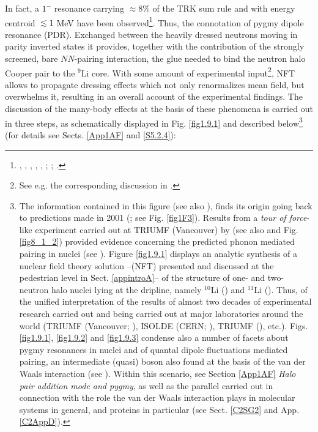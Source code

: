  In fact, a $1^-$ resonance carrying $\approx 8\%$ of the TRK sum rule and with energy centroid  $\lesssim 1$ MeV have been observed\footnote{\label{f119C2} \cite{Zinser:97}, \cite{Nakamura:06}, \cite{Shimoura:95}, \cite{Ieki:93}, \cite{Sackett:93},  \cite{Kobayashi:89}; \cite{Kanungo:15}; \cite{Aumann:19}.}. Thus, the connotation of pygmy dipole  resonance (PDR). Exchanged between the heavily dressed neutrons moving in  parity inverted states it provides, together with the contribution of the strongly screened, bare $NN$-pairing interaction, the glue needed to bind the neutron halo Cooper pair to the $^9$Li core. With some amount of experimental input\footnote{See e.g. the corresponding discussion in \cite{Barranco:17}.}, NFT allows to propagate dressing effects which not only renormalizes mean field, but overwhelms it, resulting in an overall account of the experimental findings.
The discussion of the many-body effects at the basis of these phenomena is carried out   in three steps, as schematically displayed in Fig. \ref{fig1.9.1} and described below\footnote{The information contained in this figure (see also \cite{Broglia:19b}), finds its origin going back to predictions made in 2001 (\cite{Barranco:01}; see Fig. \ref{fig1F3}). Results from a \textit{tour of force}-like experiment carried out at TRIUMF (Vancouver) by \cite{Tanihata:08} (see also \cite{Tanihata:13} and Fig. \ref{fig8_1_2})  provided evidence concerning the predicted phonon mediated pairing in nuclei (see \cite{Potel:10}). Figure \ref{fig1.9.1} displays an analytic synthesis of a nuclear field theory solution --(NFT) presented and discussed at the pedestrian level in Sect. \ref{appintroA}-- of the structure of one- and two- neutron halo nuclei lying at the dripline, namely $^{10}$Li (\cite{Barranco:20}) and $^{11}$Li (\cite{Barranco:01}). Thus, of the unified interpretation of the results of almost two decades of experimental research carried out and being carried out at major laboratories around the world (TRIUMF (Vancouver; \cite{Tanihata:08}), ISOLDE (CERN; \cite{Jeppesen:06}), TRIUMF (\cite{Cavallaro:17}), etc.). Figs. \ref{fig1.9.1}, \ref{fig1.9.2} and \ref{fig1.9.3} condense also a number of facets about pygmy resonances in nuclei  and of quantal dipole fluctuations mediated pairing, an intermediate (quasi) boson also found at the basis of the van der Waals interaction (see \cite{Broglia:19}). Within this scenario, see  Section  \ref{App1AF} \textit{Halo pair addition mode and pygmy}, as well as the parallel carried out in connection with the role the van der Waals interaction plays in molecular systems in general, and proteins in particular (see Sect. \ref{C2SG2} and App. \ref{C2AppD}).
} (for details see Sects. \ref{App1AF} and \ref{S5.2.4}):


